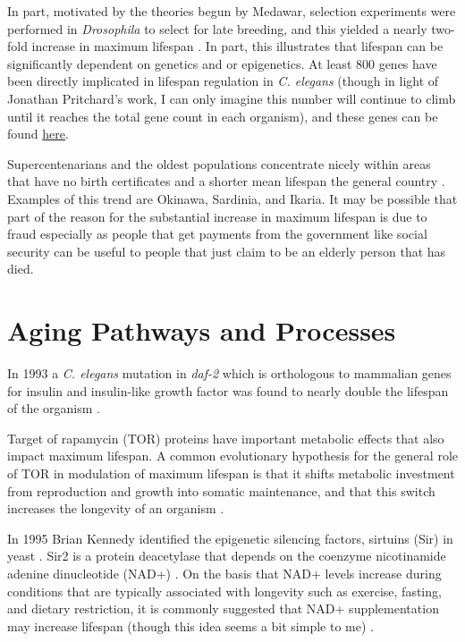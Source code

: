 \documentclass[]{book}
\begin{document}
In part, motivated by the theories begun by Medawar, selection
experiments were performed in \emph{Drosophila} to select for late
breeding, and this yielded a nearly two-fold increase in maximum
lifespan \citep{rose1980test}. In part, this illustrates that lifespan
can be significantly dependent on genetics and or epigenetics. At least
800 genes have been directly implicated in lifespan regulation in
\emph{C. elegans} (though in light of Jonathan Pritchard's work, I can
only imagine this number will continue to climb until it reaches the
total gene count in each organism), and these genes can be found
\href{http://genomics.senescence.info/genes/search.php?organism=Caenorhabditis+elegans\&show=4}{here}.

Supercentenarians and the oldest populations concentrate nicely within
areas that have no birth certificates and a shorter mean lifespan the
general country \citep{Newman2019-zs}. Examples of this trend are
Okinawa, Sardinia, and Ikaria. It may be possible that part of the
reason for the substantial increase in maximum lifespan is due to fraud
especially as people that get payments from the government like social
security can be useful to people that just claim to be an elderly person
that has died.

\section{Aging Pathways and
Processes}\label{aging-pathways-and-processes}

In 1993 a \emph{C. elegans} mutation in \emph{daf-2} which is
orthologous to mammalian genes for insulin and insulin-like growth
factor was found to nearly double the lifespan of the organism
\citep{kenyon1993c}.

Target of rapamycin (TOR) proteins have important metabolic effects that
also impact maximum lifespan. A common evolutionary hypothesis for the
general role of TOR in modulation of maximum lifespan is that it shifts
metabolic investment from reproduction and growth into somatic
maintenance, and that this switch increases the longevity of an organism
\citep{kapahi2010tor}.

In 1995 Brian Kennedy identified the epigenetic silencing factors,
sirtuins (Sir) in yeast \citep{kennedy1995mutation}. Sir2 is a protein
deacetylase that depends on the coenzyme nicotinamide adenine
dinucleotide (NAD+) \citep{imai2000transcriptional}. On the basis that
NAD+ levels increase during conditions that are typically associated
with longevity such as exercise, fasting, and dietary restriction, it is
commonly suggested that NAD+ supplementation may increase lifespan
(though this idea seems a bit simple to me) \citep{mouchiroud2013nad}.
\end{document}
